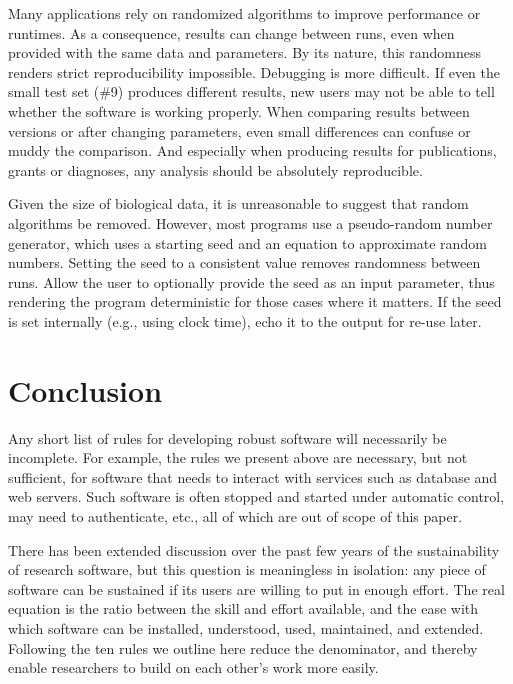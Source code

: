 \documentclass[10pt,letterpaper]{article}
\begin{document}
Many applications rely on randomized algorithms to
improve performance or runtimes. As a consequence, results can change
between runs, even when provided with the same data and parameters. By
its nature, this randomness renders strict reproducibility impossible.
Debugging is more difficult. If even the small test set (\#9) produces
different results, new users may not be able to tell whether the software is
working properly. When comparing
results between versions or after changing parameters, even small
differences can confuse or muddy the comparison. And especially when
producing results for publications, grants or diagnoses, any analysis
should be absolutely reproducible.

Given the size of biological data, it is unreasonable to suggest that
random algorithms be removed. However, most programs use a pseudo-random
number generator, which uses a starting seed and an equation to
approximate random numbers. Setting the seed to a consistent value
removes randomness between runs. Allow the user to optionally provide
the seed as an input parameter, thus rendering the program deterministic
for those cases where it matters. If the seed is set internally (e.g.,
using clock time), echo it to the output for re-use later.

\section*{Conclusion}

Any short list of rules for developing robust software will
necessarily be incomplete.  For example, the rules we present above
are necessary, but not sufficient, for software that needs to interact
with services such as database and web servers.  Such software is
often stopped and started under automatic control, may need to
authenticate, etc., all of which are out of scope of this paper.

There has been extended discussion over the past few years of the
sustainability of research software, but this question is meaningless
in isolation: any piece of software can be sustained if its users are
willing to put in enough effort.  The real equation is the ratio
between the skill and effort available, and the ease with which
software can be installed, understood, used, maintained, and extended.
Following the ten rules we outline here reduce the denominator, and
thereby enable researchers to build on each other's work more easily.


\end{document}
